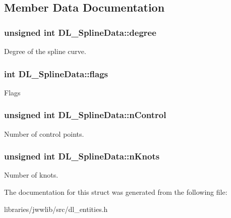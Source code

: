 \subsection{Member Data Documentation}
\hypertarget{structDL__SplineData_ad05cfaf9f9fa86cb711be86207d87777}{
\subsubsection[{degree}]{\setlength{\rightskip}{0pt plus 5cm}unsigned int D\-L\-\_\-\-Spline\-Data\-::degree}}\label{structDL__SplineData_ad05cfaf9f9fa86cb711be86207d87777}
Degree of the spline curve. \hypertarget{structDL__SplineData_a176d98ad0e03d1037d410aa52eee68f6}{
\subsubsection[{flags}]{\setlength{\rightskip}{0pt plus 5cm}int D\-L\-\_\-\-Spline\-Data\-::flags}}\label{structDL__SplineData_a176d98ad0e03d1037d410aa52eee68f6}
Flags \hypertarget{structDL__SplineData_af5f81bcc0e6ee55f9a020c8cc75cb261}{
\subsubsection[{n\-Control}]{\setlength{\rightskip}{0pt plus 5cm}unsigned int D\-L\-\_\-\-Spline\-Data\-::n\-Control}}\label{structDL__SplineData_af5f81bcc0e6ee55f9a020c8cc75cb261}
Number of control points. \hypertarget{structDL__SplineData_a764349a25f826f354c91903b0b419fc3}{
\subsubsection[{n\-Knots}]{\setlength{\rightskip}{0pt plus 5cm}unsigned int D\-L\-\_\-\-Spline\-Data\-::n\-Knots}}\label{structDL__SplineData_a764349a25f826f354c91903b0b419fc3}
Number of knots. 

The documentation for this struct was generated from the following file\-:\begin{DoxyCompactItemize}
\item 
libraries/jwwlib/src/dl\-\_\-entities.\-h\end{DoxyCompactItemize}
